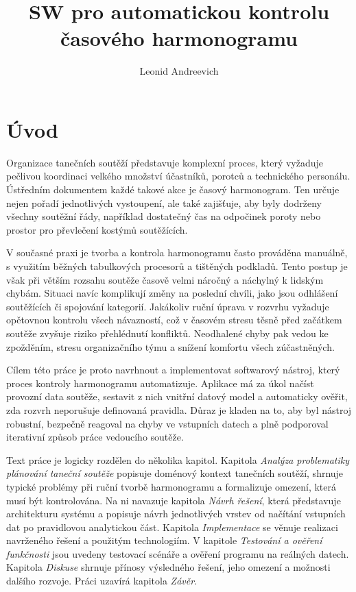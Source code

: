 \documentclass[czech, kiv, ba, he, iso690alph, pdf]{fasthesis}
\title{SW pro automatickou kontrolu časového harmonogramu}
\author{Leonid Andreevich}{Malakhov}{}{}
\begin{document}
	\frontpages[tm]
	\tableofcontents
	
	\chapter{Úvod}
	
		Organizace tanečních soutěží představuje komplexní proces, který vyžaduje pečlivou koordinaci velkého množství účastníků, porotců a technického personálu. Ústředním dokumentem každé takové akce je časový harmonogram. Ten určuje nejen pořadí jednotlivých vystoupení, ale také zajišťuje, aby byly dodrženy všechny soutěžní řády, například dostatečný čas na odpočinek poroty nebo prostor pro převlečení kostýmů soutěžících. 
	
		V současné praxi je tvorba a kontrola harmonogramu často prováděna manuálně, s využitím běžných tabulkových procesorů a tištěných podkladů. Tento postup je však při větším rozsahu soutěže časově velmi náročný a náchylný k lidským chybám. Situaci navíc komplikují změny na poslední chvíli, jako jsou odhlášení soutěžících či spojování kategorií. Jakákoliv ruční úprava v rozvrhu vyžaduje opětovnou kontrolu všech návazností, což v časovém stresu těsně před začátkem soutěže zvyšuje riziko přehlédnutí konfliktů. Neodhalené chyby pak vedou ke zpožděním, stresu organizačního týmu a snížení komfortu všech zúčastněných.
	
		Cílem této práce je proto navrhnout a implementovat softwarový nástroj, který proces kontroly harmonogramu automatizuje. Aplikace má za úkol načíst provozní data soutěže, sestavit z nich vnitřní datový model a automaticky ověřit, zda rozvrh neporušuje definovaná pravidla. Důraz je kladen na to, aby byl nástroj robustní, bezpečně reagoval na chyby ve vstupních datech a plně podporoval iterativní způsob práce vedoucího soutěže.
	
		Text práce je logicky rozdělen do několika kapitol. Kapitola \textit{Analýza problematiky plánování taneční soutěže} popisuje doménový kontext tanečních soutěží, shrnuje typické problémy při ruční tvorbě harmonogramu a formalizuje omezení, která musí být kontrolována. Na ni navazuje kapitola \textit{Návrh řešení}, která představuje architekturu systému a popisuje návrh jednotlivých vrstev od načítání vstupních dat po pravidlovou analytickou část. Kapitola \textit{Implementace} se věnuje realizaci navrženého řešení a použitým technologiím. V kapitole \textit{Testování a ověření funkčnosti} jsou uvedeny testovací scénáře a ověření programu na reálných datech. Kapitola \textit{Diskuse} shrnuje přínosy výsledného řešení, jeho omezení a možnosti dalšího rozvoje. Práci uzavírá kapitola \textit{Závěr}.
		
\end{document}
